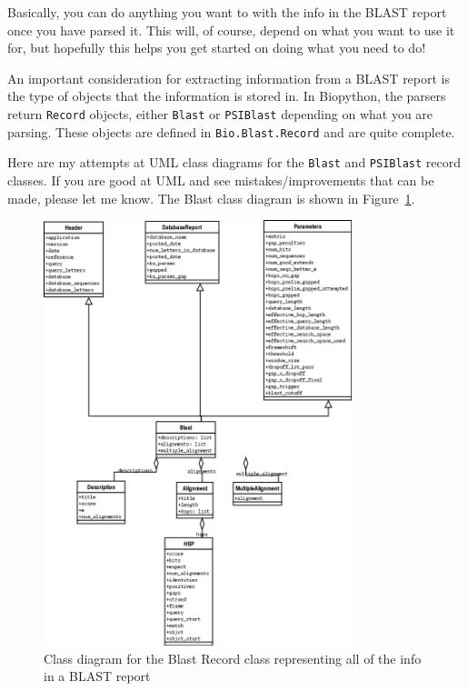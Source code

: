\documentclass{report}
\begin{document}
Basically, you can do anything you want to with the info in the BLAST
report once you have parsed it. This will, of course, depend on what
you want to use it for, but hopefully this helps you get started on
doing what you need to do!

An important consideration for extracting information from a BLAST report is the type of objects that the information is stored in. In Biopython, the parsers return \verb|Record| objects, either \verb|Blast| or \verb|PSIBlast| depending on what you are parsing. These objects are defined in \verb|Bio.Blast.Record| and are quite complete.

Here are my attempts at UML class diagrams for the \verb|Blast| and \verb|PSIBlast| record classes. If you are good at UML and see mistakes/improvements that can be made, please let me know. The Blast class diagram is shown in Figure~\ref{fig:blastrecord}.

\begin{htmlonly}
\label{fig:blastrecord}
\end{htmlonly}

\begin{latexonly}
\begin{figure}[htbp]
\centering
\includegraphics[width=0.8\textwidth]{images/BlastRecord.png}
\caption{Class diagram for the Blast Record class representing all of the info in a BLAST report}
\label{fig:blastrecord}
\end{figure}
\end{latexonly}
\end{document}
